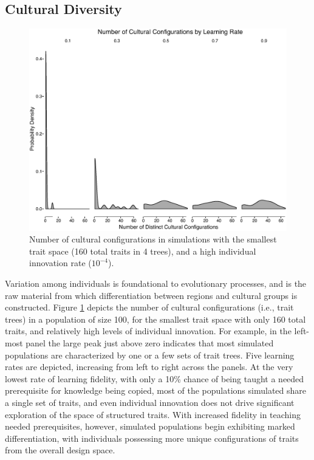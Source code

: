 \subsection{Cultural Diversity}\label{semax:sec:cultural-diversity}

\begin{figure}[htbp]
    \centering
    \includegraphics[scale=0.4]{graphics/semanticaxelrod/small-trait-high-innovation-num-configs.eps}
    \caption{Number of cultural configurations in simulations with the smallest trait space (160 total traits in 4 trees), and a high individual innovation rate ($10^{-4}$).}
    \label{semax:img:culture-count-sm-trait-high-innov}
\end{figure}

Variation among individuals is foundational to evolutionary processes,
and is the raw material from which differentiation between regions and
cultural groups is constructed. Figure
\ref{semax:img:culture-count-sm-trait-high-innov} depicts the number of
cultural configurations (i.e., trait trees) in a population of size 100,
for the smallest trait space with only 160 total traits, and relatively
high levels of individual innovation. For example, in the left-most
panel the large peak just above zero indicates that most simulated
populations are characterized by one or a few sets of trait trees. Five
learning rates are depicted, increasing from left to right across the
panels. At the very lowest rate of learning fidelity, with only a 10\%
chance of being taught a needed prerequisite for knowledge being copied,
most of the populations simulated share a single set of traits, and even
individual innovation does not drive significant exploration of the
space of structured traits. With increased fidelity in teaching needed
prerequisites, however, simulated populations begin exhibiting marked
differentiation, with individuals possessing more unique configurations
of traits from the overall design space.

